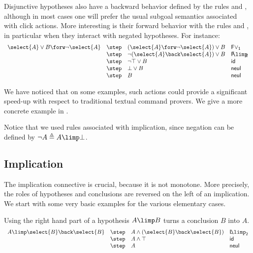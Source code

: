 Disjunctive hypotheses also have a backward behavior defined by the rules
 and , although in most cases one will prefer the
usual subgoal semantics associated with click actions. More interesting is
their forward behavior with the rules  and , in
particular when they interact with negated hypotheses. For instance:
$$
\begin{array}{llll}
  \select{A} \lor B \forw \neg \select{A}
    & \step & (\select{A} \forw \neg\select{A}) \lor B &\mathsf{F\lor_1}\\
    & \step & \neg (\select{A} \back \select{A}) \lor B &\mathsf{F\!\!\limp\!\!_1}\\
    & \step & \neg \top \lor B &\mathsf{id}\\
    & \step & \bot \lor B &\mathsf{neul}\\
    & \step & B &\mathsf{neul}\\
\end{array}
$$

We have noticed that on some examples, such actions could provide a
significant speed-up with respect to traditional textual command
provers. We give a more concrete example in .

Notice that we used rules associated with implication, since negation can be
defined by $\neg A \triangleq A \limp \bot$.

\subsection{Implication}
The implication connective is crucial, because it is not monotone. More
precisely, the roles of hypotheses and conclusions are reversed on the
left of an implication. We start with some very basic examples
for the various elementary cases.

Using the right hand part of a hypothesis $A\limp B$ turns a 
conclusion $B$ into $A$. 
$$
\begin{array}{llll}
  A\limp \select{B} \back \select{B} &\step& A\land (\select{B}
                                                \back
                                                \select{B})&\mathsf{L
                                                             \!\!\limp_2}\\
                                         &\step&A\land\top & \mathsf{id}\\
    &\step& A&\mathsf{neul}
\end{array}
$$

